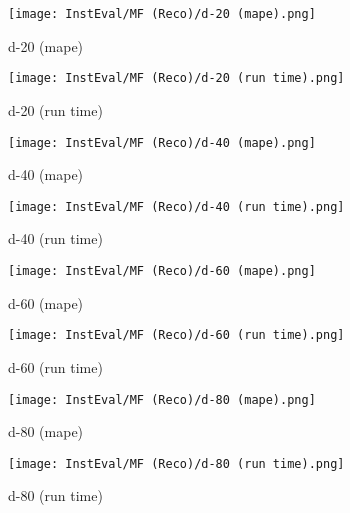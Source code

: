 \documentclass[12pt]{article}
\begin{document}
\begin{figure}[H]
\centering
    \begin{minipage}{0.45\textwidth}
        \centering
        \texttt{[image: InstEval/MF (Reco)/d-20 (mape).png]}
        \caption{d-20 (mape)}
        
    \end{minipage}\hfill
    \begin{minipage}{0.45\textwidth}
        \centering
        \texttt{[image: InstEval/MF (Reco)/d-20 (run time).png]}
        \caption{d-20 (run time)}
    \end{minipage}
\end{figure}

\begin{figure}[H]
\centering
    \begin{minipage}{0.45\textwidth}
        \centering
        \texttt{[image: InstEval/MF (Reco)/d-40 (mape).png]}
        \caption{d-40 (mape)}
        
    \end{minipage}\hfill
    \begin{minipage}{0.45\textwidth}
        \centering
        \texttt{[image: InstEval/MF (Reco)/d-40 (run time).png]}
        \caption{d-40 (run time)}
    \end{minipage}
\end{figure}

\begin{figure}[H]
\centering
    \begin{minipage}{0.45\textwidth}
        \centering
        \texttt{[image: InstEval/MF (Reco)/d-60 (mape).png]}
        \caption{d-60 (mape)}
        
    \end{minipage}\hfill
    \begin{minipage}{0.45\textwidth}
        \centering
        \texttt{[image: InstEval/MF (Reco)/d-60 (run time).png]}
        \caption{d-60 (run time)}
    \end{minipage}
\end{figure}

\begin{figure}[H]
\centering
    \begin{minipage}{0.45\textwidth}
        \centering
        \texttt{[image: InstEval/MF (Reco)/d-80 (mape).png]}
        \caption{d-80 (mape)}
        
    \end{minipage}\hfill
    \begin{minipage}{0.45\textwidth}
        \centering
        \texttt{[image: InstEval/MF (Reco)/d-80 (run time).png]}
        \caption{d-80 (run time)}
    \end{minipage}
\end{figure}
\end{document}
